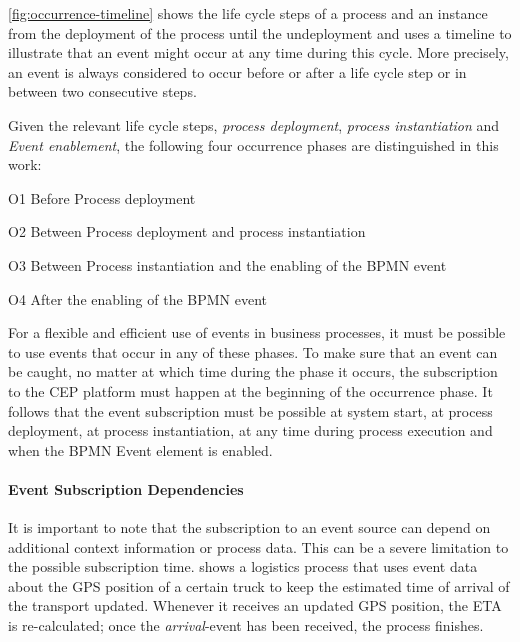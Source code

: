 \autoref{fig:occurrence-timeline} shows the life cycle steps of a process and an instance from the deployment of the process until the undeployment and uses a timeline to illustrate that an event might occur at any time during this cycle. More precisely, an event is always considered to occur before or after a life cycle step or in between two consecutive steps.

Given the relevant life cycle steps, \textit{process deployment}, \textit{process instantiation} and \textit{Event enablement}, the following four occurrence phases are distinguished in this work:
\begin{aenumerate}
	\item O1 Before Process deployment
	\item O2 Between Process deployment and process instantiation
	\item O3 Between Process instantiation and the enabling of the BPMN event
	\item O4 After the enabling of the BPMN event
\end{aenumerate}\label{def:occurrence-times}


For a flexible and efficient use of events in business processes, it must be possible to use events that occur in any of these phases.
To make sure that an event can be caught, no matter at which time during the phase it occurs, the subscription to the CEP platform must happen at the beginning of the occurrence phase.
It follows that the event subscription must be possible at system start, at process deployment, at process instantiation, at any time during process execution and when the BPMN Event element is enabled.

\paragraph{Event Subscription Dependencies}
It is important to note that the subscription to an event source can depend on additional context information or process data. This can be a severe limitation to the possible subscription time.
 shows a logistics process that uses event data about the GPS position of a certain truck to keep the estimated time of arrival of the transport updated. Whenever it receives an updated GPS position, the ETA is re-calculated; once the \textit{arrival}-event has been received, the process finishes.

